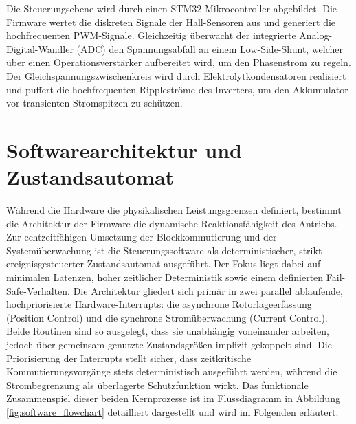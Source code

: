 Die Steuerungsebene wird durch einen STM32-Mikrocontroller abgebildet. Die Firmware wertet die diskreten Signale der Hall-Sensoren aus und generiert die hochfrequenten PWM-Signale. Gleichzeitig überwacht der integrierte Analog-Digital-Wandler (ADC) den Spannungsabfall an einem Low-Side-Shunt, welcher über einen Operationsverstärker aufbereitet wird, um den Phasenstrom zu regeln.
Der Gleichspannungszwischenkreis wird durch Elektrolytkondensatoren realisiert und puffert die hochfrequenten Rippleströme des Inverters, um den Akkumulator vor transienten Stromspitzen zu schützen.

\section{Softwarearchitektur und Zustandsautomat}
\label{sec:softwarekonzept}

Während die Hardware die physikalischen Leistungsgrenzen definiert, bestimmt die Architektur der Firmware die dynamische Reaktionsfähigkeit des Antriebs. Zur echtzeitfähigen Umsetzung der Blockkommutierung und der Systemüberwachung ist die Steuerungssoftware als deterministischer, strikt ereignisgesteuerter Zustandsautomat ausgeführt. Der Fokus liegt dabei auf minimalen Latenzen, hoher zeitlicher Deterministik sowie einem definierten Fail-Safe-Verhalten.
Die Architektur gliedert sich primär in zwei parallel ablaufende, hochpriorisierte Hardware-Interrupts: die asynchrone Rotorlageerfassung (Position Control) und die synchrone Stromüberwachung (Current Control). Beide Routinen sind so ausgelegt, dass sie unabhängig voneinander arbeiten, jedoch über gemeinsam genutzte Zustandsgrößen implizit gekoppelt sind. Die Priorisierung der Interrupts stellt sicher, dass zeitkritische Kommutierungsvorgänge stets deterministisch ausgeführt werden, während die Strombegrenzung als überlagerte Schutzfunktion wirkt.
Das funktionale Zusammenspiel dieser beiden Kernprozesse ist im Flussdiagramm in Abbildung \ref{fig:software_flowchart} detailliert dargestellt und wird im Folgenden erläutert.

